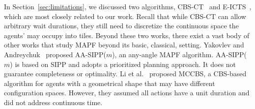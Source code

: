 \documentclass[review]{elsarticle}
\newcommand{\ccbs}{\ac{CCBS}\xspace}
\newcommand{\cbs}{\ac{CBS}\xspace}
\newcommand{\sipp}{\ac{SIPP}\xspace}
\newcommand{\mapfr}{\ac{MAPF}$_R$\xspace}
\newcommand{\mapf}{\ac{MAPF}\xspace}
\newcommand{\shortcite}{\cite}
\begin{document}
 In Section~\ref{sec:limitations}, we discussed two algorithms, CBS-CT~\cite{cohen2019optimal} and E-ICTS~\cite{walker2018extended}, which are most closely related to our work. Recall that while CBS-CT can allow arbitrary wait durations, they still need to discretize the continuous space the agents' may occupy into tiles.   
  Beyond these two works, there exist a vast body of other works that study \mapf beyond its basic, classical, setting. 
Yakovlev and Andreychuk~\shortcite{yakovlev2017anyAngle} proposed AA-SIPP($m$), an any-angle \ac{MAPF} algorithm. 
AA-SIPP($m$) is based on \sipp and adopts a prioritized planning approach. It does not guarantee completeness or optimality. 
Li et al.~\shortcite{li2019multi} proposed \ac{MCCBS}, a \cbs-based algorithm for agents with a geometrical shape that may have different configuration spaces. However, they assumed all actions have a unit duration and did not address continuous time. %
\end{document}
